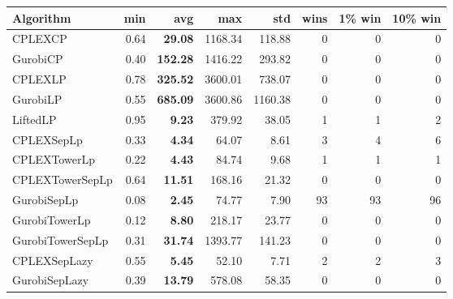 \begin{tabular}{lrrrrrrr}
Algorithm & min & avg & max & std
& wins & 1\% win & 10\% win 
\\
\hline
CPLEXCP&0.64& \bf29.08& 1168.34& 118.88&0&0&0\\
GurobiCP&0.40& \bf152.28& 1416.22& 293.82&0&0&0\\
CPLEXLP&0.78& \bf325.52& 3600.01& 738.07&0&0&0\\
GurobiLP&0.55& \bf685.09& 3600.86& 1160.38&0&0&0\\
LiftedLP&0.95& \bf9.23& 379.92& 38.05&1&1&2\\
CPLEXSepLp&0.33& \bf4.34& 64.07& 8.61&3&4&6\\
CPLEXTowerLp&0.22& \bf4.43& 84.74& 9.68&1&1&1\\
CPLEXTowerSepLp&0.64& \bf11.51& 168.16& 21.32&0&0&0\\
GurobiSepLp&0.08& \bf2.45& 74.77& 7.90&93&93&96\\
GurobiTowerLp&0.12& \bf8.80& 218.17& 23.77&0&0&0\\
GurobiTowerSepLp&0.31& \bf31.74& 1393.77& 141.23&0&0&0\\
CPLEXSepLazy&0.55& \bf5.45& 52.10& 7.71&2&2&3\\
GurobiSepLazy&0.39& \bf13.79& 578.08& 58.35&0&0&0
\end{tabular}
